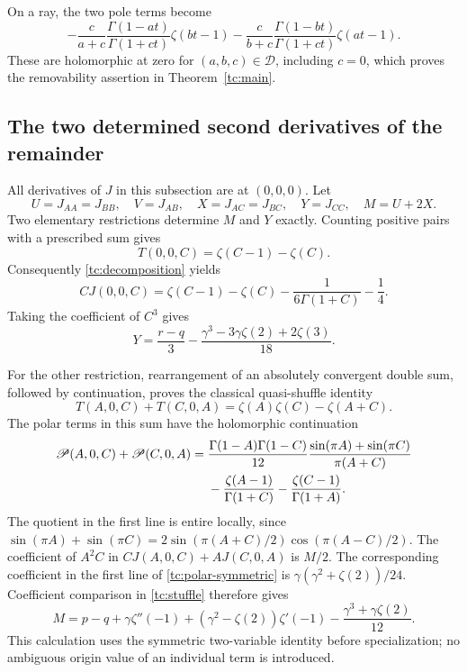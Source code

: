 \documentclass[11pt,a4paper]{article}
\numberwithin{equation}{section}
\theoremstyle{plain}
\theoremstyle{definition}
\theoremstyle{remark}
\begin{document}
On a ray, the two pole terms become
\[
 -\frac{c}{a+c}\frac{\Gamma(1-at)}{\Gamma(1+ct)}\zeta(bt-1)
 -\frac{c}{b+c}\frac{\Gamma(1-bt)}{\Gamma(1+ct)}\zeta(at-1).
\]
These are holomorphic at zero for $(a,b,c)\in\mathscr D$,
including $c=0$, which proves the removability assertion in
Theorem~\ref{tc:main}.

\subsection{The two determined second derivatives of the remainder}

All derivatives of $J$ in this subsection are at $(0,0,0)$.
Let
\[
 U=J_{AA}=J_{BB},\quad V=J_{AB},\quad
 X=J_{AC}=J_{BC},\quad Y=J_{CC},\quad M=U+2X.
\]
Two elementary restrictions determine $M$ and $Y$ exactly.
Counting positive pairs with a prescribed sum gives
\[
 T(0,0,C)=\zeta(C-1)-\zeta(C).
\]
Consequently \eqref{tc:decomposition} yields
\[
 C J(0,0,C)=\zeta(C-1)-\zeta(C)
                   -\frac{1}{6\Gamma(1+C)}-\frac14.
\]
Taking the coefficient of $C^3$ gives
\begin{equation}
 Y=\frac{r-q}{3}
       -\frac{\gamma^3-3\gamma\zeta(2)+2\zeta(3)}{18}.
 \label{tc:Y}
\end{equation}

For the other restriction, rearrangement of an absolutely convergent
double sum, followed by continuation, proves the classical
quasi-shuffle identity
\begin{equation}
 T(A,0,C)+T(C,0,A)=\zeta(A)\zeta(C)-\zeta(A+C).
 \label{tc:stuffle}
\end{equation}
The polar terms in this sum have the holomorphic continuation
\begin{align}
 \mathscr P(A,0,C)+\mathscr P(C,0,A)
 ={}&\frac{\Gamma(1-A)\Gamma(1-C)}{12}
       \frac{\sin(\pi A)+\sin(\pi C)}{\pi(A+C)}\notag\\
 &-\frac{\zeta(A-1)}{\Gamma(1+C)}
  -\frac{\zeta(C-1)}{\Gamma(1+A)}.
 \label{tc:polar-symmetric}
\end{align}
The quotient in the first line is entire locally, since
$\sin(\pi A)+\sin(\pi C)
=2\sin(\pi(A+C)/2)\cos(\pi(A-C)/2)$.
The coefficient of $A^2C$ in $C J(A,0,C)+A J(C,0,A)$ is $M/2$.
The corresponding coefficient in the first line of
\eqref{tc:polar-symmetric} is
$\gamma(\gamma^2+\zeta(2))/24$.  Coefficient comparison in
\eqref{tc:stuffle} therefore gives
\begin{equation}
 M=p-q+\gamma\zeta''(-1)
      +(\gamma^2-\zeta(2))\zeta'(-1)
      -\frac{\gamma^3+\gamma\zeta(2)}{12}.
 \label{tc:M}
\end{equation}
This calculation uses the symmetric two-variable identity before
specialization; no ambiguous origin value of an individual term is
introduced.
\end{document}
